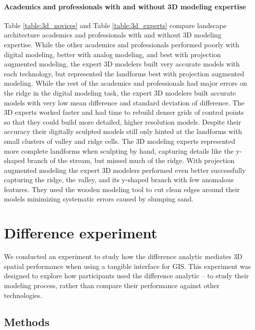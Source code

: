 \documentclass[prodmode,acmtochi]{acmsmall} %
\begin{document}
\paragraph{Academics and professionals with and without 3D modeling expertise}
%
Table \ref{table:3d_novices} and Table \ref{table:3d_experts}
compare landscape architecture academics and professionals 
with and without 3D modeling expertise. 
While the other academics and professionals
performed poorly with digital modeling, 
better with analog modeling, 
and best with projection augmented modeling,
the expert 3D modelers built very accurate models
with each technology, but represented the landforms
best with projection augmented modeling.
While the rest of the academics and professionals 
had major errors on the ridge 
in the digital modeling task,
the expert 3D modelers built accurate models 
with very low mean difference and 
standard deviation of difference. 
The 3D experts worked faster
and had time to rebuild denser grids of control points
so that they could build more detailed,
higher resolution models.
Despite their accuracy their digitally sculpted models 
still only hinted at the landforms 
with small clusters of valley and ridge cells. 
The 3D modeling experts represented 
more complete landforms when sculpting by hand,
capturing details like the y-shaped branch of the stream,
but missed much of the ridge. 
With projection augmented modeling 
the expert 3D modelers performed even better
successfully capturing
the ridge, the valley, and its y-shaped branch
with few anomalous features. 
%
They used the wooden modeling tool 
to cut clean edges around their models
minimizing systematic errors caused by slumping sand.

\section{Difference experiment}
We conducted an experiment to study 
how the difference analytic mediates 3D spatial performance 
when using a tangible interface for GIS.
%
This experiment was designed to explore how
participants used the difference analytic 
-- to study their modeling process,
rather than compare their performance against other technologies.  

\subsection{Methods}

% 
%
\end{document}
